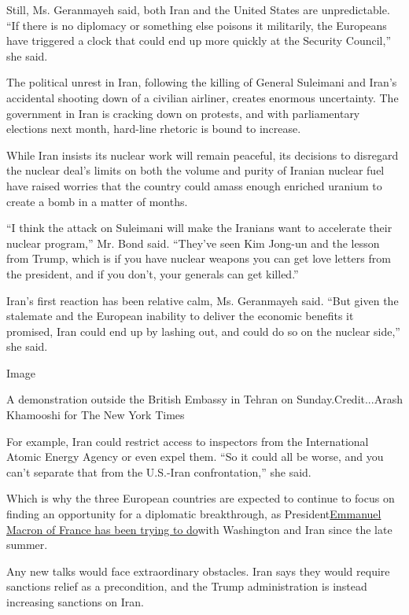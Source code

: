 Still, Ms. Geranmayeh said, both Iran and the United States are
unpredictable. ``If there is no diplomacy or something else poisons it
militarily, the Europeans have triggered a clock that could end up more
quickly at the Security Council,'' she said.

The political unrest in Iran, following the killing of General Suleimani
and Iran's accidental shooting down of a civilian airliner, creates
enormous uncertainty. The government in Iran is cracking down on
protests, and with parliamentary elections next month, hard-line
rhetoric is bound to increase.

While Iran insists its nuclear work will remain peaceful, its decisions
to disregard the nuclear deal's limits on both the volume and purity of
Iranian nuclear fuel have raised worries that the country could amass
enough enriched uranium to create a bomb in a matter of months.

``I think the attack on Suleimani will make the Iranians want to
accelerate their nuclear program,'' Mr. Bond said. ``They've seen Kim
Jong-un and the lesson from Trump, which is if you have nuclear weapons
you can get love letters from the president, and if you don't, your
generals can get killed.''

Iran's first reaction has been relative calm, Ms. Geranmayeh said. ``But
given the stalemate and the European inability to deliver the economic
benefits it promised, Iran could end up by lashing out, and could do so
on the nuclear side,'' she said.

Image

A demonstration outside the British Embassy in Tehran on
Sunday.Credit...Arash Khamooshi for The New York Times

For example, Iran could restrict access to inspectors from the
International Atomic Energy Agency or even expel them. ``So it could all
be worse, and you can't separate that from the U.S.-Iran
confrontation,'' she said.

Which is why the three European countries are expected to continue to
focus on finding an opportunity for a diplomatic breakthrough, as
President\href{https://www.nytimes.com/2019/09/30/world/middleeast/iran-trump-rouhani-call-macron.html?searchResultPosition=1}{Emmanuel
Macron of France has been trying to do}with Washington and Iran since
the late summer.

Any new talks would face extraordinary obstacles. Iran says they would
require sanctions relief as a precondition, and the Trump administration
is instead increasing sanctions on Iran.

